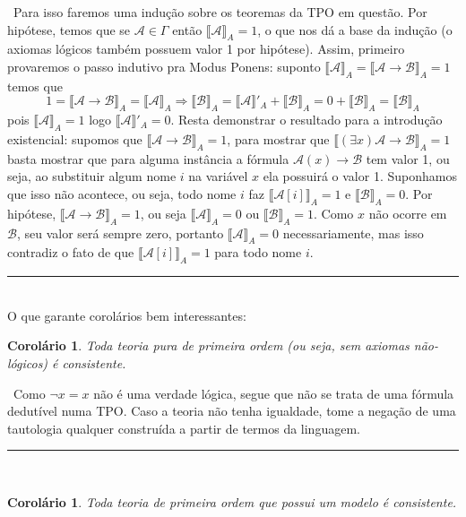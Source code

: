 \documentclass[11pt,a4paper]{article}
\newtheorem{cor}[mydef]{Corolário}
\def\dem{\par\smallbreak\noindent {\textit{ Demonstração:}} \ }
\def\eop{\hfill\rule{2.5mm}{2.5mm} \\ }
\theoremstyle{definition}
\begin{document}
\dem Para isso faremos uma indução sobre os teoremas da TPO em questão. Por hipótese, temos que se $\mathscr{A}\in \Gamma$ então $\llbracket \mathscr{A} \rrbracket_A =1$, o que nos dá a base da indução (o axiomas lógicos também possuem valor 1 por hipótese). Assim, primeiro provaremos o passo indutivo pra Modus Ponens: suponto $\llbracket \mathscr{A} \rrbracket_A =\llbracket \mathscr{A}\rightarrow \mathscr{B} \rrbracket_A =1$ temos que $$1=\llbracket \mathscr{A}\rightarrow \mathscr{B} \rrbracket_A =\llbracket \mathscr{A} \rrbracket_A\Rightarrow \llbracket \mathscr{B} \rrbracket_A=\llbracket \mathscr{A} \rrbracket'_A + \llbracket \mathscr{B} \rrbracket_A=0+\llbracket \mathscr{B} \rrbracket_A=\llbracket \mathscr{B} \rrbracket_A$$ pois $\llbracket \mathscr{A} \rrbracket_A=1$ logo $\llbracket \mathscr{A} \rrbracket'_A=0$. Resta demonstrar o resultado para a introdução existencial: supomos que $\llbracket \mathscr{A}\rightarrow \mathscr{B} \rrbracket_A =1$, para mostrar que $\llbracket (\exists x)\mathscr{A}\rightarrow \mathscr{B} \rrbracket_A =1$ basta mostrar que para alguma instância a fórmula $\mathscr{A}(x)\rightarrow \mathscr{B} $ tem valor 1, ou seja, ao substituir algum nome $i$ na variável $x$ ela possuirá o valor 1. Suponhamos que isso não acontece, ou seja, todo nome $i$ faz $\llbracket \mathscr{A}[i] \rrbracket_A =1$ e $\llbracket \mathscr{B} \rrbracket_A =0$. Por hipótese, $\llbracket \mathscr{A}\rightarrow \mathscr{B} \rrbracket_A =1$, ou seja $\llbracket \mathscr{A} \rrbracket_A=0$ ou $\llbracket\mathscr{B} \rrbracket_A =1$. Como $x$ não ocorre em $\mathscr{B}$, seu valor será sempre zero, portanto $\llbracket \mathscr{A} \rrbracket_A=0$ necessariamente, mas isso contradiz o fato de que $\llbracket \mathscr{A}[i] \rrbracket_A =1$ para todo nome $i$. \eop

O que garante corolários bem interessantes: 

\begin{cor}
	
	Toda teoria pura de primeira ordem (ou seja, sem axiomas não-lógicos) é consistente.
	
\end{cor}   

\dem Como $\neg x=x$ não é uma verdade lógica, segue que não se trata de uma fórmula dedutível numa TPO. Caso a teoria não tenha igualdade, tome a negação de uma tautologia qualquer construída a partir de termos da linguagem. \eop

\begin{cor}
	
	Toda teoria de primeira ordem que possui um modelo é consistente.
	
\end{cor}
\end{document}
